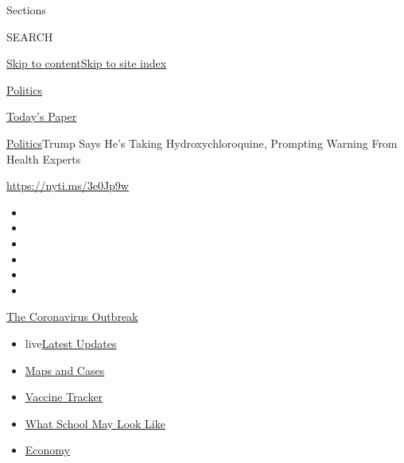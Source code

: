Sections

SEARCH

\protect\hyperlink{site-content}{Skip to
content}\protect\hyperlink{site-index}{Skip to site index}

\href{https://www.nytimes.com/section/politics}{Politics}

\href{https://myaccount.nytimes.com/auth/login?response_type=cookie\&client_id=vi}{}

\href{https://www.nytimes.com/section/todayspaper}{Today's Paper}

\href{/section/politics}{Politics}\textbar{}Trump Says He's Taking
Hydroxychloroquine, Prompting Warning From Health Experts

\url{https://nyti.ms/3e0Jp9w}

\begin{itemize}
\item
\item
\item
\item
\item
\item
\end{itemize}

\href{https://www.nytimes.com/news-event/coronavirus?action=click\&pgtype=Article\&state=default\&region=TOP_BANNER\&context=storylines_menu}{The
Coronavirus Outbreak}

\begin{itemize}
\tightlist
\item
  live\href{https://www.nytimes.com/2020/08/01/world/coronavirus-covid-19.html?action=click\&pgtype=Article\&state=default\&region=TOP_BANNER\&context=storylines_menu}{Latest
  Updates}
\item
  \href{https://www.nytimes.com/interactive/2020/us/coronavirus-us-cases.html?action=click\&pgtype=Article\&state=default\&region=TOP_BANNER\&context=storylines_menu}{Maps
  and Cases}
\item
  \href{https://www.nytimes.com/interactive/2020/science/coronavirus-vaccine-tracker.html?action=click\&pgtype=Article\&state=default\&region=TOP_BANNER\&context=storylines_menu}{Vaccine
  Tracker}
\item
  \href{https://www.nytimes.com/interactive/2020/07/29/us/schools-reopening-coronavirus.html?action=click\&pgtype=Article\&state=default\&region=TOP_BANNER\&context=storylines_menu}{What
  School May Look Like}
\item
  \href{https://www.nytimes.com/live/2020/07/31/business/stock-market-today-coronavirus?action=click\&pgtype=Article\&state=default\&region=TOP_BANNER\&context=storylines_menu}{Economy}
\end{itemize}

